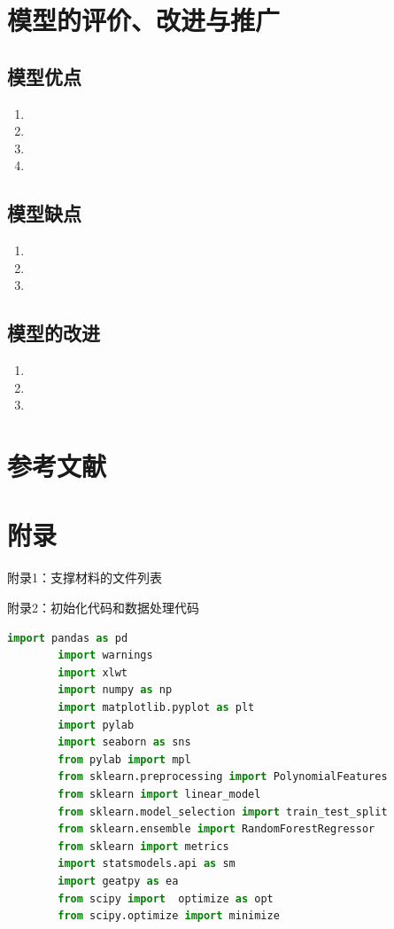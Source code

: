 \documentclass[a4paper]{article}
\begin{document}
		
		
	\section{模型的评价、改进与推广}
	\subsection{模型优点}
	\begin{enumerate}
		\item 
		\item 
		\item 
		\item 
	\end{enumerate}
	
	\subsection{模型缺点}
	\begin{enumerate}
		\item 
		\item 
		\item 
	\end{enumerate}
	
	\subsection{模型的改进}
	\begin{enumerate}
		\item 
		\item 
		\item 
	\end{enumerate}
	
	\section{参考文献}
	\vspace{-2em} %
	\begin{thebibliography}{9}  
	\end{thebibliography}
	
	\newpage
	\section*{附录}
	
	附录1：支撑材料的文件列表
	
	
	附录2：初始化代码和数据处理代码
	\begin{lstlisting}[language=python,columns=fullflexible,frame=shadowbox]
		import pandas as pd
		import warnings
		import xlwt
		import numpy as np
		import matplotlib.pyplot as plt
		import pylab
		import seaborn as sns
		from pylab import mpl
		from sklearn.preprocessing import PolynomialFeatures
		from sklearn import linear_model
		from sklearn.model_selection import train_test_split
		from sklearn.ensemble import RandomForestRegressor
		from sklearn import metrics
		import statsmodels.api as sm
		import geatpy as ea
		from scipy import  optimize as opt
		from scipy.optimize import minimize
	\end{lstlisting}
	
\end{document}
